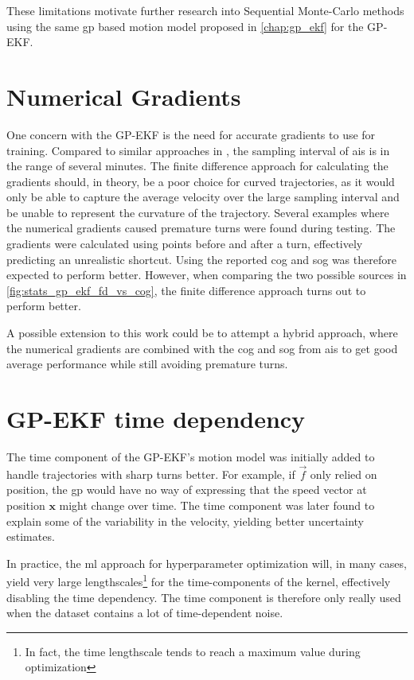 These limitations motivate further research into Sequential Monte-Carlo methods using the same \acrshort{gp} based motion model proposed in \cref{chap:gp_ekf} for the GP-EKF.  

\section{Numerical Gradients}
One concern with the GP-EKF is the need for accurate gradients to use for training. Compared to similar approaches in \cite{vehicle_gp_prediction,pedestrian}, the sampling interval of \acrshort{ais} is in the range of several minutes. The finite difference approach for calculating the gradients should, in theory, be a poor choice for curved trajectories, as it would only be able to capture the average velocity over the large sampling interval and be unable to represent the curvature of the trajectory. Several examples where the numerical gradients caused premature turns were found during testing. The gradients were calculated using points before and after a turn, effectively predicting an unrealistic shortcut.  Using the reported \acrshort{cog} and \acrshort{sog} was therefore expected to perform better. 
However, when comparing the two possible sources in \cref{fig:stats_gp_ekf_fd_vs_cog}, the finite difference approach turns out to perform better. 

A possible extension to this work could be to attempt a hybrid approach, where the numerical gradients are combined with the \acrshort{cog} and \acrshort{sog} from \acrshort{ais} to get good average performance while still avoiding premature turns. 

\section{GP-EKF time dependency}
The time component of the GP-EKF's motion model was initially added to handle trajectories with sharp turns better. For example, if $\vec{f}$ only relied on position, the \acrshort{gp} would have no way of expressing that the speed vector at position $\boldsymbol{x}$ might change over time. The time component was later found to explain some of the variability in the velocity, yielding better uncertainty estimates.

In practice, the \acrshort{ml} approach for hyperparameter optimization will, in many cases, yield very large lengthscales\footnote{In fact, the time lengthscale tends to reach a maximum value during optimization} for the time-components of the kernel, effectively disabling the time dependency. The time component is therefore only really used when the dataset contains a lot of time-dependent noise.

